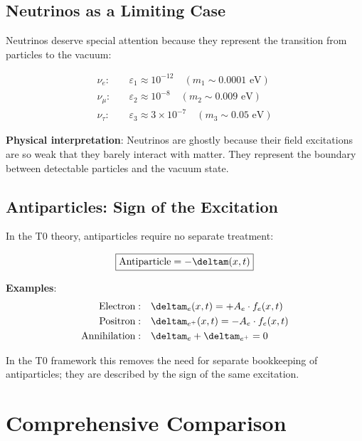 	\subsection{Neutrinos as a Limiting Case}
	
	Neutrinos deserve special attention because they represent the transition from particles to the vacuum:
	
	\begin{equation}
		\begin{aligned}
			\nu_e: \quad &\varepsilon_1 \approx 10^{-12} \quad (m_1 \sim 0.0001 \text{ eV}) \\
			\nu_\mu: \quad &\varepsilon_2 \approx 10^{-8} \quad (m_2 \sim 0.009 \text{ eV}) \\
			\nu_\tau: \quad &\varepsilon_3 \approx 3 \times 10^{-7} \quad (m_3 \sim 0.05 \text{ eV})
		\end{aligned}
		\label{eq:neutrino_spectrum}
	\end{equation}
	
	\textbf{Physical interpretation}: Neutrinos are ghostly because their field excitations are so weak that they barely interact with matter. They represent the boundary between detectable particles and the vacuum state.
	
	\subsection{Antiparticles: Sign of the Excitation}
	
	In the T0 theory, antiparticles require no separate treatment:
	
	\begin{equation}
		\boxed{\text{Antiparticle} = -\deltam(x,t)}
		\label{eq:antiparticle_unification}
	\end{equation}
	
	\textbf{Examples}:
	\begin{align}
		\text{Electron}: \quad &\deltam_e(x,t) = +A_e \cdot f_e(x,t) \\
		\text{Positron}: \quad &\deltam_{e^+}(x,t) = -A_e \cdot f_e(x,t) \\
		\text{Annihilation}: \quad &\deltam_e + \deltam_{e^+} = 0
	\end{align}
	
	In the T0 framework this removes the need for separate bookkeeping of antiparticles; they are described by the sign of the same excitation.
	
	\section{Comprehensive Comparison}
	
